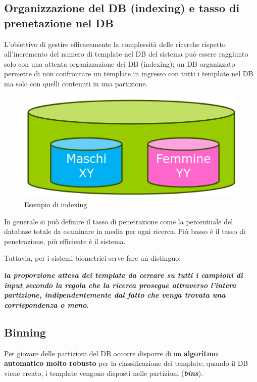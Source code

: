 \subsection{Organizzazione del DB (indexing) e tasso di prenetazione nel DB}

L’obiettivo di gestire efficacemente la complessità delle
ricerche rispetto all’incremento del numero di template nel
DB del sistema può essere raggiunto solo con una attenta
organizzazione dei DB (indexing); un DB organizzato permette di non confrontare un
template in ingresso con tutti i template nel DB ma solo
con quelli contenuti in una partizione.

\begin{figure}[ht]
    \centering
    \includegraphics[width=0.75\linewidth]{chapters/images-chap2/indexing.png}
    \caption{Esempio di indexing}
\end{figure}

\noindent In generale si può definire il tasso di penetrazione come la
percentuale del database totale da esaminare in media per
ogni ricerca. Più basso è il tasso di penetrazione, più
efficiente è il sistema.

\noindent Tuttavia, per i sistemi biometrici serve fare un distinguo: 

\noindent \textit{\textbf{la proporzione attesa dei template da cercare su tutti i campioni di input secondo
la regola che la ricerca prosegue attraverso l'intera partizione, indipendentemente
dal fatto che venga trovata una corrispondenza o meno}}.

\subsection{Binning}

Per giovare delle partizioni del DB occorre disporre di un
\textbf{algoritmo automatico molto robusto} per la classificazione
dei template; quando il DB viene creato, i template vengono disposti nelle partizioni (\textbf{\textit{bins}}).

